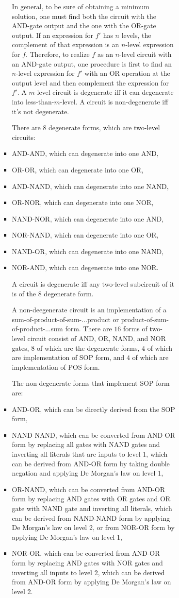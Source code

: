 \documentclass[a4paper,12pt]{article}
\begin{document}
\begin{itemize}
\begin{itemize}
\begin{itemize}
\begin{itemize}
\begin{itemize}
\begin{itemize}
\begin{itemize}
In general, to be sure of obtaining a minimum solution, one must find both the circuit with the AND-gate output and the one with the OR-gate output. If an expression for $f'$ has $n$ levels, the complement of that expression is an $n$-level expression for $f$. Therefore, to realize $f$ as an $n$-level circuit with an AND-gate output, one procedure is first to find an $n$-level expression for $f'$ with an OR operation at the output level and then complement the expression for $f'$.
A $m$-level circuit is degenerate iff it can degenerate into less-than-$m$-level. A circuit is non-degenerate iff it's not degenerate.

There are $8$ degenerate forms, which are two-level circuits:
\bit
\item AND-AND, which can degenerate into one AND,
\item OR-OR, which can degenerate into one OR,
\item AND-NAND, which can degenerate into one NAND,
\item OR-NOR, which can degenerate into one NOR,
\item NAND-NOR, which can degenerate into one AND,
\item NOR-NAND, which can degenerate into one OR,
\item NAND-OR, which can degenerate into one NAND,
\item NOR-AND, which can degenerate into one NOR.
\eit

A circuit is degenerate iff any two-level subcircuit of it is of the $8$ degenerate form.

A non-deegenerate circuit is an implementation of a sum-of-product-of-sum-$\ldots$product or product-of-sum-of-product-$\ldots$sum form.
There are $16$ forms of two-level circuit consist of AND, OR, NAND, and NOR gates, $8$ of which are the degenerate forms, $4$ of which are implementation of SOP form, and $4$ of which are implementation of POS form.

The non-degenerate forms that implement SOP form are:
\bit
\item AND-OR, which can be directly derived from the SOP form,
\item NAND-NAND, which can be converted from AND-OR form by replacing all gates with NAND gates and inverting all literals that are inputs to level 1, which can be derived from AND-OR form by taking double negation and applying De Morgan's law on level 1,
\item OR-NAND, which can be converted from AND-OR form by replacing AND gates with OR gates and OR gate with NAND gate and inverting all literals, which can be derived from NAND-NAND form by applying De Morgan's law on level 2, or from NOR-OR form by applying De Morgan's law on level 1,
\item NOR-OR, which can be converted from AND-OR form by replacing AND gates with NOR gates and inverting all inputs to level 2, which can be derived from AND-OR form by applying De Morgan's law on level 2.
\eit


\end{itemize}
\end{itemize}
\end{itemize}
\end{itemize}
\end{itemize}
\end{itemize}
\end{itemize}
\end{document}
